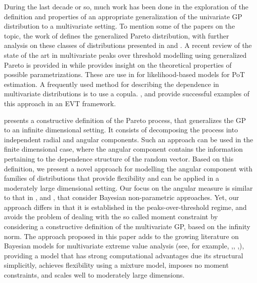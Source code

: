 During the last decade or so, much work has been done in the exploration of the 
    definition and properties of an appropriate generalization of the univariate 
    GP distribution to a multivariate setting.  To mention some of the papers on 
    the topic, the work of \citep{rootzen2006} defines the generalized Pareto 
    distribution, with further analysis on these classes of distributions 
    presented in \cite{falk2008} and \cite{michel2008}.  A recent review of the 
    state of the art in multivariate peaks over threshold modelling using 
    generalized Pareto is provided in \cite{rootzen2018} while \cite{RoSeWa2018a} 
    provides insight on the theoretical properties of possible parametrizations. 
    These are use in \cite{KiRoSeWa2019} for likelihood-based models for PoT 
    estimation. A frequently used method for describing the dependence in 
    multivariate distributions is to use a copula. \cite{renard2007}, and 
    \cite{falk2019} provide successful examples of this approach in an EVT 
    framework. 
    
    \cite{ferreira2014} presents a constructive definition of the 
    Pareto process, that generalizes the GP to an infinite dimensional setting. It 
    consists of decomposing the process into independent radial and angular 
    components. Such an approach can be used in the finite dimensional case, where 
    the angular component contains the information pertaining to the dependence 
    structure of the random vector. Based on this definition, we present a novel 
    approach for modelling  the angular component with families of distributions 
    that provide flexibility and can be applied in a moderately large dimensional 
    setting.  Our focus on the angular measure is similar to that in \cite{boldi2007},
    \cite{SaNa2014} and \cite{HaCaCh2017}, that consider Bayesian non-parametric 
    approaches. Yet, our approach differs in that it is established in the 
    peaks-over-threshold regime, and avoids the problem of dealing with the so 
    called moment constraint by considering a constructive definition of the 
    multivariate GP, based on the infinity norm. The approach proposed in this paper
    adds to the growing literature on Bayesian models for multivariate extreme
    value analysis (see, for example, \cite{boldi2007},\cite{guillotte2011},
    \cite{SaNa2014},\cite{hanson2017}), providing a model that has strong computational
    advantages due its structural simplicitly, achieves flexibility using 
    a mixture model, imposes no moment constraints, and scales well to moderately 
    large dimensions.
  
